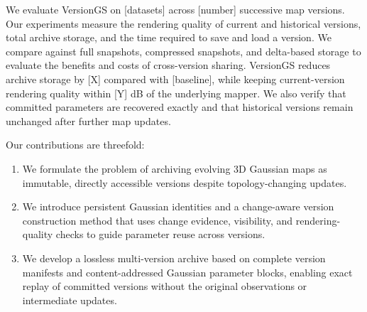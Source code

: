 We evaluate VersionGS on [datasets] across [number] successive map
versions. Our experiments measure the rendering quality of current
and historical versions, total archive storage, and the time required
to save and load a version. We compare against full snapshots,
compressed snapshots, and delta-based storage to evaluate the
benefits and costs of cross-version sharing. VersionGS reduces
archive storage by [X] compared with [baseline], while keeping
current-version rendering quality within [Y] dB of the underlying
mapper. We also verify that committed parameters are recovered
exactly and that historical versions remain unchanged after further
map updates.

Our contributions are threefold:
\begin{enumerate}
    \item We formulate the problem of archiving evolving 3D Gaussian
    maps as immutable, directly accessible versions despite
    topology-changing updates.

    \item We introduce persistent Gaussian identities and a
    change-aware version construction method that uses change
    evidence, visibility, and rendering-quality checks to guide
    parameter reuse across versions.

    \item We develop a lossless multi-version archive based on
    complete version manifests and content-addressed Gaussian
    parameter blocks, enabling exact replay of committed versions
    without the original observations or intermediate updates.
\end{enumerate}